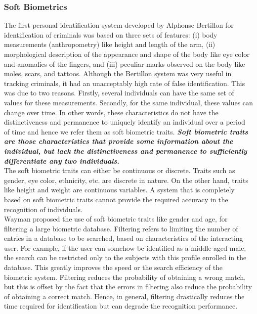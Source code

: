 \documentclass[12pt]{article}			%
\begin{document}
\subsubsection{ Soft Biometrics }
The first personal identification system developed by Alphonse Bertillon\cite{bert96} for identification of criminals was based on three sets of features: (i) body measurements (anthropometry) like height and length of the arm, (ii) morphological description of the appearance and shape of the body like eye color and anomalies of the fingers, and (iii) peculiar marks observed on the body like moles, scars, and tattoos. Although the Bertillon system was very useful in tracking criminals, it had an unacceptably high rate of false identification. This was due to two reasons. Firstly, several individuals can have the same set of values for these measurements. Secondly, for the same individual, these values can change over time. In other words, these characteristics do not have the distinctiveness and permanence to uniquely identify an individual over a period of time and hence we refer them as soft biometric traits. {\bf \it Soft biometric traits are those
characteristics that provide some information about the individual, but lack the distinctiveness and permanence to sufficiently differentiate any two individuals.}\cite{Jain204}\\
The soft biometric traits can either be continuous or discrete. Traits such as gender, eye color, ethnicity, etc. are discrete in nature. On the other hand, traits like height and weight are continuous variables. A system that is completely based on soft biometric traits cannot provide the required accuracy in the recognition of individuals.\\
Wayman\cite{way97} proposed the use of soft biometric traits like gender and age, for filtering a large biometric database. Filtering refers to limiting the number of entries in a database to be searched, based on characteristics of the interacting user. For example, if the user can somehow be identified as a middle-aged male, the search can be restricted only to the subjects with this profile enrolled in the database. This greatly improves the speed or the search efficiency of the biometric system. Filtering reduces the probability of obtaining a wrong match, but this is offset by the fact that the errors in filtering also reduce the probability of obtaining a correct match. Hence, in general, filtering drastically reduces the time required for identification but can degrade the recognition performance.
\end{document}
